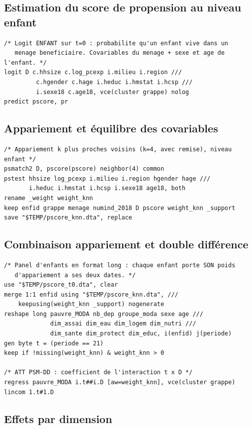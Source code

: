 \subsection{Estimation du score de propension au niveau enfant}

\begin{verbatim}
/* Logit ENFANT sur t=0 : probabilite qu'un enfant vive dans un
   menage beneficiaire. Covariables du menage + sexe et age de l'enfant. */
logit D c.hhsize c.log_pcexp i.milieu i.region ///
         c.hgender c.hage i.heduc i.hmstat i.hcsp ///
         i.sexe18 c.age18, vce(cluster grappe) nolog
predict pscore, pr
\end{verbatim}

\subsection{Appariement et équilibre des covariables}

\begin{verbatim}
/* Appariement k plus proches voisins (k=4, avec remise), niveau enfant */
psmatch2 D, pscore(pscore) neighbor(4) common
pstest hhsize log_pcexp i.milieu i.region hgender hage ///
       i.heduc i.hmstat i.hcsp i.sexe18 age18, both
rename _weight weight_knn
keep enfid grappe menage numind_2018 D pscore weight_knn _support
save "$TEMP/pscore_knn.dta", replace
\end{verbatim}

\subsection{Combinaison appariement et double différence}

\begin{verbatim}
/* Panel d'enfants en format long : chaque enfant porte SON poids
   d'appariement a ses deux dates. */
use "$TEMP/pscore_t0.dta", clear
merge 1:1 enfid using "$TEMP/pscore_knn.dta", ///
    keepusing(weight_knn _support) nogenerate
reshape long pauvre_MODA nb_dep groupe_moda sexe age ///
             dim_assai dim_eau dim_logem dim_nutri ///
             dim_sante dim_protect dim_educ, i(enfid) j(periode)
gen byte t = (periode == 21)
keep if !missing(weight_knn) & weight_knn > 0

/* ATT PSM-DD : coefficient de l'interaction t x D */
regress pauvre_MODA i.t##i.D [aw=weight_knn], vce(cluster grappe)
lincom 1.t#1.D
\end{verbatim}

\subsection{Effets par dimension}

